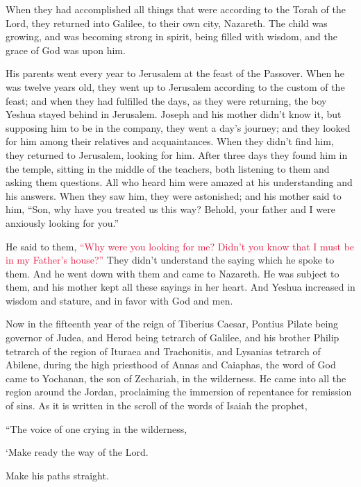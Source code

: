 \myverse{}When they had accomplished all things that were according to
the Torah of the Lord, they returned into Galilee, to their own city, Nazareth.
\myverse{}The child was growing, and was becoming strong in spirit, being filled with
wisdom, and the grace of God was upon him.

\myverse{}His parents went every year to Jerusalem at the feast of the
Passover.
\myverse{}When he was twelve years old, they went up to Jerusalem according to the custom
of the feast;
\myverse{}and when they had fulfilled the days, as they were returning, the boy Yeshua
stayed behind in Jerusalem. Joseph and his mother didn’t know it,
\myverse{}but supposing him to be in the company, they went a day’s journey; and they
looked for him among their relatives and acquaintances.
\myverse{}When they didn’t find him, they returned to Jerusalem, looking for him.
\myverse{}After three days they found him in the temple, sitting in the middle of the
teachers, both listening to them and asking them questions.
\myverse{}All who heard him were amazed at his understanding and his answers.
\myverse{}When they saw him, they were astonished; and his mother said to him, “Son,
why have you treated us this way? Behold, your father and I were anxiously looking for you.”

\myverse{}He said to them,
\textcolor{crimson}{“Why were you looking for me? Didn’t you know that I must be in my Father’s house?”}
\myverse{}They didn’t understand the saying which he spoke to them.
\myverse{}And he went down with them and came to Nazareth. He was subject to them, and
his mother kept all these sayings in her heart.
\myverse{}And Yeshua increased in wisdom and stature, and in favor with God and men.


\mychapter{} \myverse*{}Now in the fifteenth year of the reign of Tiberius Caesar, Pontius
Pilate being governor of Judea, and Herod being tetrarch of Galilee, and his brother Philip tetrarch of
the region of Ituraea and Trachonitis, and Lysanias tetrarch of Abilene,
\myverse{}during the high priesthood of Annas and Caiaphas, the word of God came to Yochanan,
the son of Zechariah, in the wilderness.
\myverse{}He came into all the region around the Jordan, proclaiming the immersion of
repentance for remission of sins.
\myverse{}As it is written in the scroll of the words of Isaiah the prophet,

“The voice of one crying in the wilderness,

‘Make ready the way of the Lord.

Make his paths straight.

